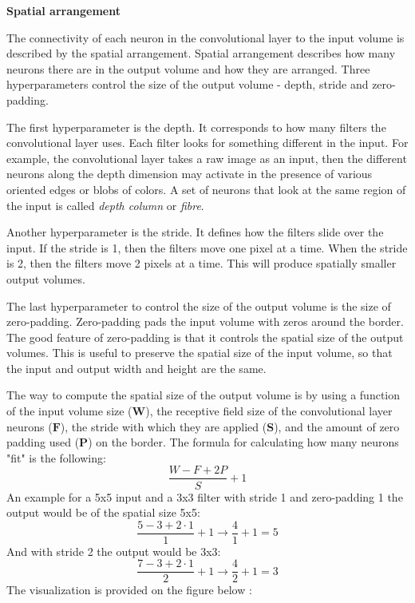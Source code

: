 \textbf{Spatial arrangement}

The connectivity of each neuron in the convolutional layer to the input volume is described by the spatial arrangement. Spatial arrangement describes how many neurons there are in the output volume and how they are arranged. Three hyperparameters control the size of the output volume - depth, stride and zero-padding.

The first hyperparameter is the depth. It corresponds to how many filters the convolutional layer uses. Each filter looks for something different in the input. For example, the convolutional layer takes a raw image as an input, then the different neurons along the depth dimension may activate in the presence of various oriented edges or blobs of colors. A set of neurons that look at the same region of the input is called \textit{depth column} or \textit{fibre}.

Another hyperparameter is the stride. It defines how the filters slide over the input. If the stride is 1, then the filters move one pixel at a time. When the stride is 2, then the filters move 2 pixels at a time. This will produce spatially smaller output volumes.

The last hyperparameter to control the size of the output volume is the size of zero-padding. Zero-padding pads the input volume with zeros around the border. The good feature of zero-padding is that it controls the spatial size of the output volumes. This is useful to preserve the spatial size of the input volume, so that the input and output width and height are the same. 

The way to compute the spatial size of the output volume is by using a function of the input volume size ($\textbf{W}$), the receptive field size of the convolutional layer neurons ($\textbf{F}$), the stride with which they are applied ($\textbf{S}$), and the amount of zero padding used ($\textbf{P}$) on the border. The formula for calculating how many neurons "fit" is the following:
\begin{equation}
\frac{W-F+2P}{S}+1
\end{equation}    
An example for a 5x5 input and a 3x3 filter with stride 1 and zero-padding 1 the output would be of the spatial size 5x5:
\begin{equation}
\frac{5-3+2\cdot1 }{1}+1         \rightarrow             \frac{4}{1}+1 =5
\end{equation} 
And with stride 2 the output would be 3x3:
\begin{equation}
\frac{7-3+2\cdot1 }{2}+1         \rightarrow             \frac{4}{2}+1 =3
\end{equation} 
The visualization is provided on the figure below : 

